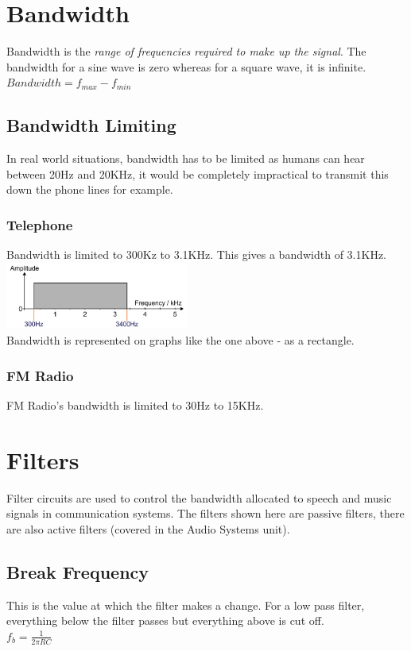 \documentclass[a4paper,11pt, twocolumn]{article}
\begin{document}
\section{Bandwidth}
Bandwidth is the \textit{range of frequencies required to make up the signal}. The bandwidth for a sine wave is zero whereas for a square wave, it is infinite. \\
$Bandwidth = f_{max} - f_{min}$\\
\subsection{Bandwidth Limiting}
In real world situations, bandwidth has to be limited as humans can hear between 20Hz and 20KHz, it would be completely impractical to transmit this down the phone lines for example.
\subsubsection{Telephone}
Bandwidth is limited to 300Kz to 3.1KHz. This gives a bandwidth of 3.1KHz. \\
\includegraphics[width=0.45\textwidth]{telephoneBandwidth.jpg}\\
Bandwidth is represented on graphs like the one above - as a rectangle. 
\subsubsection{FM Radio}
FM Radio's bandwidth is limited to 30Hz to 15KHz.

\section{Filters}
Filter circuits are used to control the bandwidth allocated to speech and music signals in communication systems. The filters shown here are passive filters, there are also active filters (covered in the Audio Systems unit).
\subsection{Break Frequency}
This is the value at which the filter makes a change. For a low pass filter, everything below the filter passes but everything above is cut off. \\
$\displaystyle f_{b}=\frac{1}{2 \pi R C}$
\end{document}
